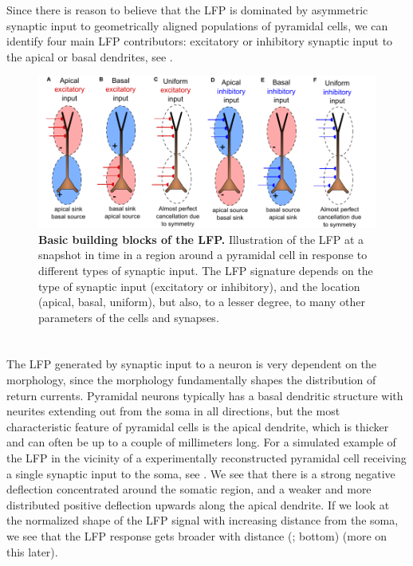 Since there is reason to believe that the LFP is dominated by asymmetric synaptic input to geometrically aligned populations of pyramidal cells, we can identify four main LFP contributors: excitatory or inhibitory synaptic input to the apical or basal dendrites, see .

\begin{figure}[!ht]
\begin{center}
\includegraphics[width=.7\textwidth]{Figures/LFP/dipole_basics.pdf}
\end{center}
\caption{\textbf{Basic building blocks of the LFP.}
Illustration of the LFP at a snapshot in time in a region around a pyramidal
cell in response to different types of synaptic input. The LFP signature depends on the type of synaptic input (excitatory or inhibitory), and the location (apical, basal, uniform), but also, to a lesser degree, to many other parameters of the cells and synapses.
}
\label{fig:LFP:LFP_lego}
\end{figure}

\section{}
\label{sec:LFP:morph_matters}

The LFP generated by synaptic input to a neuron is very dependent on the morphology, since the morphology fundamentally shapes the distribution of return currents. 
Pyramidal neurons typically has a basal dendritic structure with neurites extending out from the soma in all directions, but the most characteristic feature of pyramidal cells is the apical dendrite, which is thicker and can often be up to a couple of millimeters long.
For a simulated example of the LFP in the vicinity of a experimentally reconstructed pyramidal cell receiving a single synaptic input to the soma, see . We see that there is a strong negative deflection concentrated around the somatic region, and a weaker and more distributed positive deflection upwards along the apical dendrite. If we look at the normalized shape of the LFP signal with increasing distance from the soma, we see that the LFP response gets broader with distance (; bottom) (more on this later).

